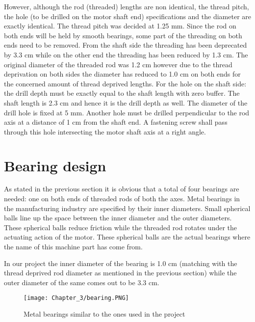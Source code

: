 However, although the rod (threaded) lengths are non identical, the thread pitch, the hole (to be drilled on the motor shaft end) specifications and the diameter are exactly identical. The thread pitch was decided at 1.25 mm. Since the rod on both ends will be held by smooth bearings, some part of the threading on both ends need to be removed. From the shaft side the threading has been deprecated by 3.3 cm while on the other end the threading has been reduced by 1.3 cm. The original diameter of the threaded rod was 1.2 cm however due to the thread deprivation on both sides the diameter has reduced to 1.0 cm on both ends for the concerned amount of thread deprived lengths. For the hole on the shaft side: the drill depth must be exactly equal to the shaft length with zero buffer. The shaft length is 2.3 cm and hence it is the drill depth as well. The diameter of the drill hole is fixed at 5 mm. Another hole must be drilled perpendicular to the rod axis at a distance of 1 cm from the shaft end. A fastening screw shall pass through this hole intersecting the motor shaft axis at a right angle.



\section{Bearing design}

As stated in the previous section it is obvious that a total of four bearings are needed: one on both ends of threaded rods of both the axes. Metal bearings in the manufacturing industry are specified by their inner diameters. Small spherical balls line up the space between the inner diameter and the outer diameters. These spherical balls reduce friction while the threaded rod rotates under the actuating action of the motor. These spherical balls are the actual bearings where the name of this machine part has come from. \par

In our project the inner diameter of the bearing is 1.0 cm (matching with the thread deprived rod diameter as mentioned in the previous section) while the outer diameter of the same comes out to be 3.3 cm.

\begin{figure}[h]
 \centering
 \texttt{[image: Chapter\_3/bearing.PNG]}
 \caption{Metal bearings similar to the ones used in the project}
 \label{fig:bearing}
\end{figure}

